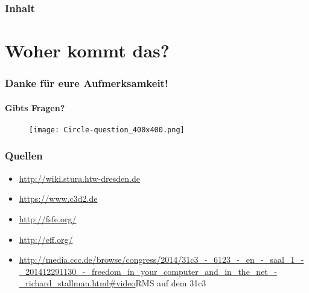 \documentclass{beamer}              %
\begin{document}
\begin{frame}
  \frametitle{Inhalt}
  \tableofcontents
\end{frame}

\AtBeginSection{%
  \tableofcontents[currentsection]
}

\section{Woher kommt das?}










\begin{frame}
  \frametitle{Danke für eure Aufmerksamkeit!}
  \framesubtitle{Gibts Fragen?}

  \begin{figure}
      \texttt{[image: Circle-question\_400x400.png]}
      \label{fig:Fragezeichenschild}
  \end{figure}

\end{frame}


\begin{frame}
  \frametitle{Quellen}
  \begin{itemize}
    \item \url{http://wiki.stura.htw-dresden.de}
    \item \url{https://www.c3d2.de}
    \item \url{http://fsfe.org/}
    \item \url{http://eff.org/}
    \item \url{http://media.ccc.de/browse/congress/2014/31c3_-_6123_-_en_-_saal_1_-_201412291130_-_freedom_in_your_computer_and_in_the_net_-_richard_stallman.html#video}{RMS auf dem 31c3}
    
  \end{itemize}  
\end{frame}
\end{document}
